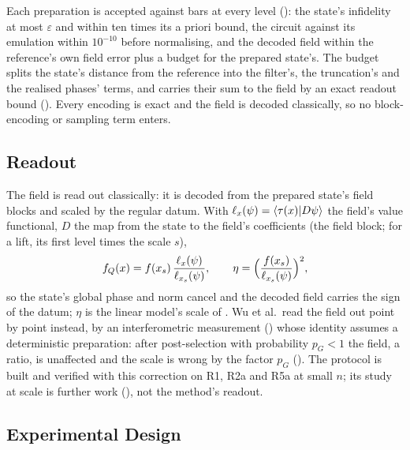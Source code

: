 Each preparation is accepted against bars at every level (): the state's infidelity at most $\varepsilon$ and within ten times its a priori bound, the circuit against its emulation within $10^{-10}$ before normalising, and the decoded field within the reference's own field error plus a budget for the prepared state's. The budget splits the state's distance from the reference into the filter's, the truncation's and the realised phases' terms, and carries their sum to the field by an exact readout bound (). Every encoding is exact and the field is decoded classically, so no block-encoding or sampling term enters.

\subsection{Readout}
\label{sec:pipeline-readout}

The field is read out classically: it is decoded from the prepared state's field blocks and scaled by the regular datum. With $\ell_x(\psi)=\braket{\tau(x)|D\psi}$ the field's value functional, $D$ the map from the state to the field's coefficients (the field block; for a lift, its first level times the scale $s$),
\begin{equation}
    f_Q(x)=f(x_s)\,\frac{\ell_x(\psi)}{\ell_{x_s}(\psi)},
    \qquad
    \eta=\Bigl(\frac{f(x_s)}{\ell_{x_s}(\psi)}\Bigr)^{2},
    \label{eq:readout-field}
\end{equation}
so the state's global phase and norm cancel and the decoded field carries the sign of the datum; $\eta$ is the linear model's scale of . Wu et al.\ read the field out point by point instead, by an interferometric measurement () whose identity assumes a deterministic preparation: after post-selection with probability $p_G<1$ the field, a ratio, is unaffected and the scale is wrong by the factor $p_G$ (). The protocol is built and verified with this correction on R1, R2a and R5a at small $n$; its study at scale is further work (), not the method's readout.

\subsection{Experimental Design}
\label{sec:pipeline-design}

